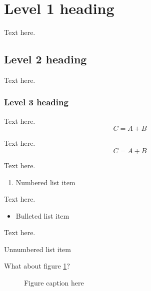 \documentclass{ICED-Paper}%
\begin{document}

\section{Level 1 heading}
Text here.

\subsection{Level 2 heading}
Text here.

\subsubsection{Level 3 heading}
Text here.
\begin{equation}%
C = A + B
\end{equation}

Text here.
\begin{equation*}%
C = A + B
\end{equation*}

Text here.
\begin{enumerate}
\item Numbered list item
\end{enumerate}

Text here.
\begin{itemize}
\item Bulleted list item
\end{itemize}

Text here.
\begin{description}
\item Unnumbered list item
\end{description}

What about figure \ref{fig1}?

\begin{figure}
\caption{Figure caption here\label{fig1}}
\end{figure}
\end{document}
